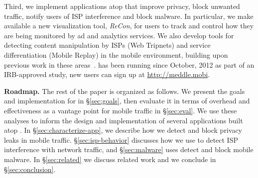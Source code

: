 Third, we implement applications atop \meddle that improve 
privacy, block unwanted traffic, notify users of ISP interference and block malware. 
In particular, we make available a new visualization tool, \emph{ReCon}, for users to track and control how 
they are being monitored by ad and analytics services. 
 We also develop tools for detecting content manipulation by ISPs (Web Tripnets) and 
 service differentiation (Mobile Replay) in the mobile environment, building upon previous 
 work in these areas~\cite{reis:tripwires,dischinger:glasnost}. 
\meddle has been running since 
October, 2012 as part of an IRB-approved study, new users can sign up at \url{http://meddle.mobi}. 






\noindent\textbf{Roadmap.} The rest of the paper is organized as follows. We present the goals and implementation for \meddle in \S\ref{sec:goals}, then evaluate it in terms of overhead and effectiveness as a vantage point for mobile traffic in \S\ref{sec:eval}. We use these analyses to inform the design and implementation of several applications built atop \meddle. 
In \S\ref{sec:characterize-app}, we describe how we detect and block privacy leaks in mobile traffic. \S\ref{sec:isp-behavior} discusses 
how we use \meddle to detect ISP interference with network traffic, and \S\ref{sec:malware} uses \meddle detect and block mobile malware. In \S\ref{sec:related} we discuss related work and we conclude in \S\ref{sec:conclusion}.

